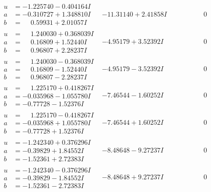 \documentclass[1p]{elsarticle_modified}
\theoremstyle{definition}
\begin{document}
$$\begin{array}{c|c|c}
\begin{aligned}
u &= -1.225740 - 0.404164 I \\
a &= -0.310727 + 1.348810 I \\
b &= \phantom{-}0.59931 + 2.01057 I\end{aligned}
 & -11.31140 + 2.41858 I & \phantom{-0.000000 } 0 \\ \hline\begin{aligned}
u &= \phantom{-}1.240030 + 0.368039 I \\
a &= \phantom{-}0.16809 + 1.52440 I \\
b &= \phantom{-}0.96807 + 2.28237 I\end{aligned}
 & -4.95179 + 3.52392 I & \phantom{-0.000000 } 0 \\ \hline\begin{aligned}
u &= \phantom{-}1.240030 - 0.368039 I \\
a &= \phantom{-}0.16809 - 1.52440 I \\
b &= \phantom{-}0.96807 - 2.28237 I\end{aligned}
 & -4.95179 - 3.52392 I & \phantom{-0.000000 } 0 \\ \hline\begin{aligned}
u &= \phantom{-}1.225170 + 0.418267 I \\
a &= -0.035968 - 1.055780 I \\
b &= -0.77728 - 1.52376 I\end{aligned}
 & -7.46544 - 1.60252 I & \phantom{-0.000000 } 0 \\ \hline\begin{aligned}
u &= \phantom{-}1.225170 - 0.418267 I \\
a &= -0.035968 + 1.055780 I \\
b &= -0.77728 + 1.52376 I\end{aligned}
 & -7.46544 + 1.60252 I & \phantom{-0.000000 } 0 \\ \hline\begin{aligned}
u &= -1.242340 + 0.376296 I \\
a &= -0.39829 + 1.84552 I \\
b &= -1.52361 + 2.72383 I\end{aligned}
 & -8.48648 - 9.27237 I & \phantom{-0.000000 } 0 \\ \hline\begin{aligned}
u &= -1.242340 - 0.376296 I \\
a &= -0.39829 - 1.84552 I \\
b &= -1.52361 - 2.72383 I\end{aligned}
 & -8.48648 + 9.27237 I & \phantom{-0.000000 } 0 \\ \hline\begin{aligned}

\end{aligned}
\end{array}$$
\end{document}
